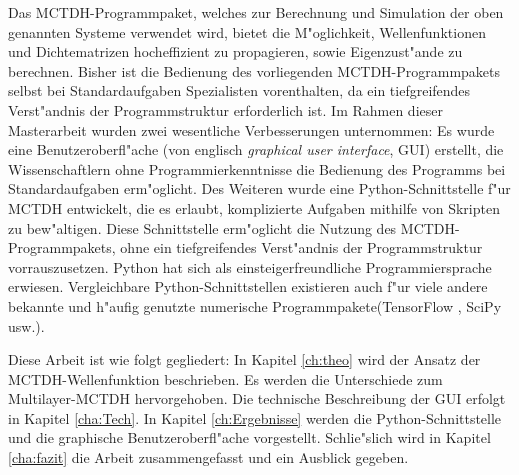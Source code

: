 Das MCTDH-Programmpaket, welches zur Berechnung und Simulation der oben ge\-nann\-ten Systeme verwendet wird, bietet die M"oglichkeit,
Wellenfunktionen und Dichte\-matrizen hocheffizient zu propagieren, sowie Eigenzust"ande zu berechnen.
Bisher ist die Bedienung des vorliegenden MCTDH-Programmpakets selbst bei Standardaufgaben Spezialisten vorenthalten, da
ein tiefgreifendes Verst"andnis der Programmstruktur erforderlich ist. 
Im Rahmen dieser Masterarbeit wurden zwei wesentliche Verbesserungen unternommen: 
Es wurde eine Benutzeroberfl"ache (von englisch \textit{graphical user interface}, GUI) erstellt, die Wissenschaftlern
ohne Programmierkenntnisse die Bedienung des Programms bei Standardaufgaben erm"oglicht.
Des Weiteren wurde eine Python-Schnittstelle f"ur MCTDH entwickelt,
die es erlaubt, komplizierte Aufgaben mithilfe von Skripten zu bew"altigen.
Diese Schnittstelle erm"oglicht die Nutzung des MCTDH-Programmpakets, ohne 
ein tiefgreifendes Verst"andnis der Programmstruktur vorrauszusetzen.
Python hat sich als einsteigerfreundliche Programmiersprache erwiesen. Vergleichbare Python-Schnitt\-stellen existieren auch f"ur viele andere bekannte und h"aufig genutzte 
numerische Programmpakete(TensorFlow \cite{TensorFlow}, SciPy \cite{SciPy} usw.).

Diese Arbeit ist wie folgt gegliedert: In Kapitel \ref{ch:theo} wird der Ansatz der MCTDH-Wellenfunk\-tion beschrieben. 
Es werden die Unterschiede zum Multilayer-MCTDH hervorgehoben. 
Die technische Beschreibung der GUI erfolgt in Kapitel \ref{cha:Tech}.
In Kapitel \ref{ch:Ergebnisse} werden die Python-Schnittstelle und die graphische Benutzeroberfl"ache vorgestellt.     
Schlie"slich wird in Kapitel \ref{cha:fazit} die Arbeit zusammengefasst und ein Ausblick gegeben.     